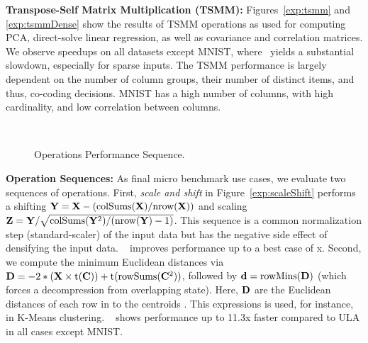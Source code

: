 \textbf{Transpose-Self Matrix Multiplication (TSMM):} Figures~\ref{exp:tsmm} and \ref{exp:tsmmDense} show the results of TSMM operations as used for computing PCA, direct-solve linear regression, as well as covariance and correlation matrices.
We observe speedups on all datasets except MNIST, where \name\ yields a substantial slowdown, especially for sparse inputs.
The TSMM performance is largely dependent on the number of column groups, their number of distinct items, and thus,
co-coding decisions. MNIST has a high number of columns, with high cardinality, and low correlation between columns.

\begin{figure}[!t]
	\hfill
	~\vspace{-0.4cm}\\
	\caption{\label{exp:opsseq}Operations Performance Sequence.}
\end{figure}

\textbf{Operation Sequences:}
As final micro benchmark use cases, we evaluate two sequences of operations. First, \emph{scale and shift} in Figure~\ref{exp:scaleShift}
performs a shifting $\mathbf{Y} = \mathbf{X} - (\text{colSums}(\mathbf{X})/\text{nrow}(\mathbf{X}))$ and scaling $\mathbf{Z} = \mathbf{Y} / \sqrt{\text{colSums}(\mathbf{Y}^2)/(\text{nrow}(\mathbf{Y})-1)}$.
This sequence is a common normalization step (standard-scaler) of the input data but has the negative side effect of densifying the input data.
\name~ improves performance up to a best case of x. Second, we compute the minimum Euclidean distances via $\mathbf{D} = -2 * (\mathbf{X} \times \text{t}(\mathbf{C})) + \text{t}(\text{rowSums}(\mathbf{C}^2))$, followed by $\mathbf{d} = \text{rowMins}(\mathbf{D})$ (which forces a decompression from overlapping state). Here, $\mathbf{D}$ are the Euclidean distances of each row in  to the centroids . This expressions is used, for instance, in K-Means clustering. \name~ shows performance up to 11.3x faster compared to ULA in all cases except MNIST.

